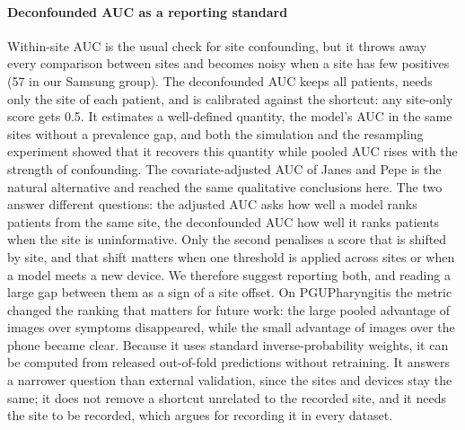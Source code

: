 \documentclass[preprint,12pt]{elsarticle}
\begin{document}
\paragraph{Deconfounded AUC as a reporting standard} Within-site AUC is the usual check for site confounding, but it throws away every comparison between sites and becomes noisy when a site has few positives (57 in our Samsung group). The deconfounded AUC keeps all patients, needs only the site of each patient, and is calibrated against the shortcut: any site-only score gets 0.5. It estimates a well-defined quantity, the model's AUC in the same sites without a prevalence gap, and both the simulation and the resampling experiment showed that it recovers this quantity while pooled AUC rises with the strength of confounding. The covariate-adjusted AUC of Janes and Pepe \cite{janes2008adjusting} is the natural alternative and reached the same qualitative conclusions here. The two answer different questions: the adjusted AUC asks how well a model ranks patients from the same site, the deconfounded AUC how well it ranks patients when the site is uninformative. Only the second penalises a score that is shifted by site, and that shift matters when one threshold is applied across sites or when a model meets a new device. We therefore suggest reporting both, and reading a large gap between them as a sign of a site offset. On PGUPharyngitis the metric changed the ranking that matters for future work: the large pooled advantage of images over symptoms disappeared, while the small advantage of images over the phone became clear. Because it uses standard inverse-probability weights, it can be computed from released out-of-fold predictions without retraining. It answers a narrower question than external validation, since the sites and devices stay the same; it does not remove a shortcut unrelated to the recorded site, and it needs the site to be recorded, which argues for recording it in every dataset.
\end{document}
